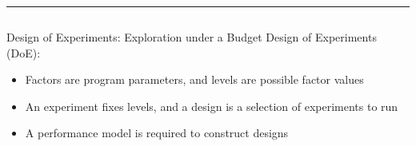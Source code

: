 \documentclass[11pt, compress, aspectratio=169, xcolor={table,usenames,dvipsnames}]{beamer}
\begin{document}
\begin{frame}
\begin{columns}
\begin{column}{0.89\columnwidth}
\vspace{0.2em}
\rule{\columnwidth}{0.4ex}
\vspace{-2.5em}
\begin{columns}
\begin{column}[t]{0.48\columnwidth}
\begin{block}{Design of Experiments: Exploration under a Budget}
\alert{Design of Experiments} (\alert{DoE}):
\vspace{1em}
\begin{itemize}
\item \alert{Factors} are program \alert{parameters},
and \alert{levels} are possible factor \alert{values}
\item An \alert{experiment} fixes levels,
and a \alert{design} is a \alert{selection} of experiments to \alert{run}
\item A \alert{performance model} is required to \alert{construct designs}


\end{itemize}
\end{block}
\end{column}
\end{columns}
\end{column}
\end{columns}
\end{frame}
\end{document}

